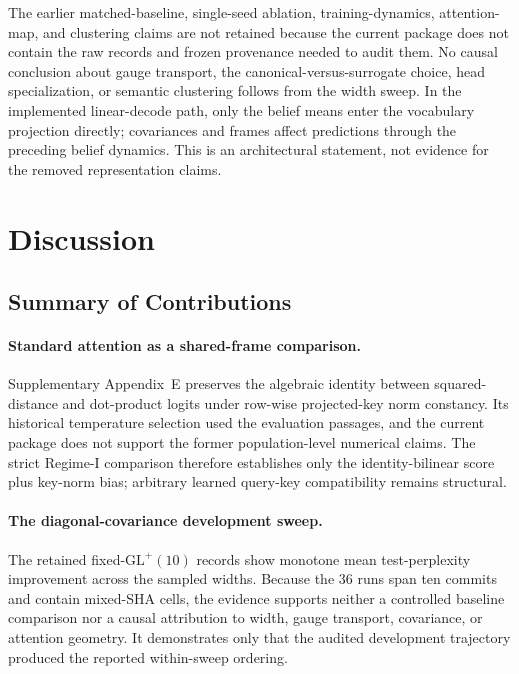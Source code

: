 \documentclass[twoside,11pt]{article}
\begin{document}
The earlier matched-baseline, single-seed ablation, training-dynamics, attention-map, and clustering claims are not retained because the current package does not contain the raw records and frozen provenance needed to audit them. No causal conclusion about gauge transport, the canonical-versus-surrogate choice, head specialization, or semantic clustering follows from the width sweep. In the implemented linear-decode path, only the belief means enter the vocabulary projection directly; covariances and frames affect predictions through the preceding belief dynamics. This is an architectural statement, not evidence for the removed representation claims.


\section{Discussion}

\subsection{Summary of Contributions}

\paragraph{Standard attention as a shared-frame comparison.} Supplementary Appendix~E preserves the algebraic identity between squared-distance and dot-product logits under row-wise projected-key norm constancy. Its historical temperature selection used the evaluation passages, and the current package does not support the former population-level numerical claims. The strict Regime-I comparison therefore establishes only the identity-bilinear score plus key-norm bias; arbitrary learned query-key compatibility remains structural.

\paragraph{The diagonal-covariance development sweep.} The retained fixed-$\mathrm{GL}^+(10)$ records show monotone mean test-perplexity improvement across the sampled widths. Because the 36 runs span ten commits and contain mixed-SHA cells, the evidence supports neither a controlled baseline comparison nor a causal attribution to width, gauge transport, covariance, or attention geometry. It demonstrates only that the audited development trajectory produced the reported within-sweep ordering.
\end{document}
